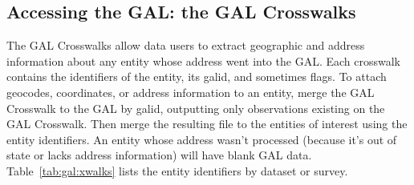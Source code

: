 % 
% 
% 
% 
% 
% 
% 
% 

\subsection{Accessing the GAL: the GAL Crosswalks}
\label{sec:gal:xwalks}

The GAL Crosswalks allow data users to extract geographic and address information about any entity whose
address went into the GAL. Each crosswalk contains the identifiers of the entity, its galid, and sometimes
flags. To attach geocodes, coordinates, or address information to an entity, merge the GAL Crosswalk to
the GAL by galid, outputting only observations existing on the GAL Crosswalk. Then merge the
resulting file to the entities of interest using the entity identifiers. An entity whose address wasn't
processed (because it's out of state or lacks address information) will
have blank GAL data. Table~\ref{tab:gal:xwalks} lists the entity
identifiers by dataset or survey.

